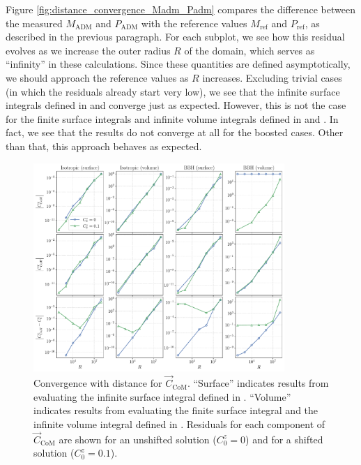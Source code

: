 \documentclass{../document}
\begin{document}
      Figure \ref{fig:distance_convergence_Madm_Padm} compares the difference between the measured $M_\text{ADM}$ and $P_\text{ADM}$ with the reference values $M_\text{ref}$ and $P_\text{ref}$, as described in the previous paragraph. For each subplot, we see how this residual evolves as we increase the outer radius $R$ of the domain, which serves as ``infinity'' in these calculations. Since these quantities are defined asymptotically, we should approach the reference values as $R$ increases. Excluding trivial cases (in which the residuals already start very low), we see that the infinite surface integrals defined in \eq{\eqref{eq:Madm-surf}} and \eq{\eqref{eq:Padm-surf}} converge just as expected. However, this is not the case for the finite surface integrals and infinite volume integrals defined in \eq{\eqref{eq:Madm-mixed}} and \eq{\eqref{eq:Padm-mixed}}. In fact, we see that the results do not converge at all for the boosted cases.  Other than that, this approach behaves as expected.

      \begin{figure}
        \centering
        \includegraphics[width=0.85\textwidth]{../../plots/final_report/distance_convergence_CoM.pdf}
        \caption{Convergence with distance for $\vec C_\text{CoM}$. ``Surface'' indicates results from evaluating the infinite surface integral defined in \eq{\eqref{eq:CoM-surf}}. ``Volume'' indicates results from evaluating the finite surface integral and the infinite volume integral defined in \eq{\eqref{eq:CoM-mixed}}. Residuals for each component of $\vec C_\text{CoM}$ are shown for an unshifted solution ($C_0^z = 0$) and for a shifted solution ($C_0^z = 0.1$).}
        \label{fig:distance_convergence_CoM}
      \end{figure}
\end{document}
